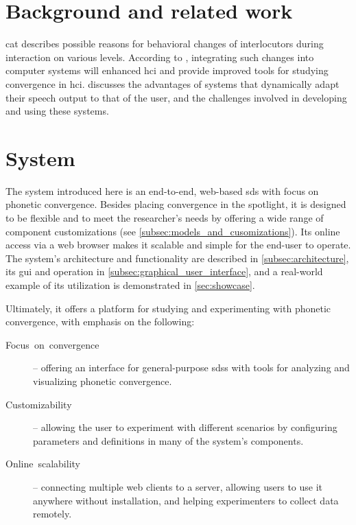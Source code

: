 

\section{Background and related work}
\label{sec:background_and_related_work}

\ac{cat} \citep{Gallois2015CAT, Giles2007CAT, Shepard2001CAT} describes possible reasons for behavioral changes of interlocutors during interaction on various levels.
According to \citet{Weise2017towards}, integrating such changes into computer systems will enhanced \ac{hci} and provide improved tools for studying convergence in \ac{hci}.
\citet{Oviatt2004adaptive} discusses the advantages of systems that dynamically adapt their speech output to that of the user, and the challenges involved in developing and using these systems.

\section{System}
\label{sec:system}

The system introduced here is an end-to-end, web-based \ac{sds} with focus on phonetic convergence.
Besides placing convergence in the spotlight, it is designed to be flexible and to meet the researcher's needs by offering a wide range of component customizations (see \cref{subsec:models_and_cusomizations}).
Its online access via a web browser makes it scalable and simple for the end-user to operate.
The system's architecture and functionality are described in \cref{subsec:architecture},
its \ac{gui} and operation in \cref{subsec:graphical_user_interface},
and a real-world example of its utilization is demonstrated in \cref{sec:showcase}.

Ultimately, it offers a platform for studying and experimenting with phonetic convergence, with emphasis on the following:

\begin{description}
	\item[Focus~on~convergence] -- 
	offering an interface for general-purpose \acp{sds} with tools for analyzing and visualizing phonetic convergence.
	
	\item[Customizability] -- 
	allowing the user to experiment with different scenarios by configuring parameters and definitions in many of the system's components.
	
	\item[Online~scalability] -- 
	connecting multiple web clients to a server, allowing users to use it anywhere without installation, and helping experimenters to collect data remotely.
\end{description}

